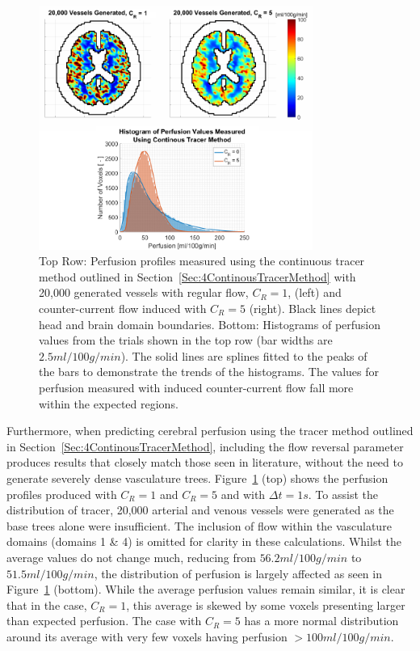 \documentclass[11pt,english,a4paper,twoside,openright]{report}
\begin{document}
{{{{{{{\begin{figure}[h]
	\centering
	\includegraphics[width=0.8\textwidth]{Chapter5/Chapter5_Section3PerfusionProfiles}
	\caption[Comparison of perfusion profiles and histograms of perfusion values when using $C_{R}=1$ and $C_{R}=5$]{Top Row: Perfusion profiles measured using the continuous tracer method outlined in Section~\ref{Sec:4ContinousTracerMethod} with 20,000 generated vessels with regular flow, $C_{R}=1$, (left) and counter-current flow induced with $C_{R}=5$ (right). Black lines depict head and brain domain boundaries. Bottom: Histograms of perfusion values from the trials shown in the top row (bar widths are $2.5ml/100g/min$). The solid lines are splines fitted to the peaks of the bars to demonstrate the trends of the histograms. The values for perfusion measured with induced counter-current flow fall more within the expected regions.}
	\label{fig:PerfusionHistogram}
\end{figure}

Furthermore, when predicting cerebral perfusion using the tracer method outlined in Section~\ref{Sec:4ContinousTracerMethod}, including the flow reversal parameter produces results that closely match those seen in literature, without the need to generate severely dense vasculature trees. Figure~\ref{fig:PerfusionHistogram} (top) shows the perfusion profiles produced with $C_{R}=1$ and $C_{R}=5$ and with $\Delta t=1s$. To assist the distribution of tracer, 20,000 arterial and venous vessels were generated as the base trees alone were insufficient. The inclusion of flow within the vasculature domains (domains 1 \& 4) is omitted for clarity in these calculations. Whilst the average values do not change much, reducing from $56.2ml/100g/min$ to $51.5ml/100g/min$, the distribution of perfusion is largely affected as seen in Figure~\ref{fig:PerfusionHistogram} (bottom). While the average perfusion values remain similar, it is clear that in the case, $C_{R}=1$, this average is skewed by some voxels presenting larger than expected perfusion. The case with $C_{R}=5$ has a more normal distribution around its average with very few voxels having perfusion {$>$}$100ml/100g/min$. 

}}}}}}}
\end{document}
